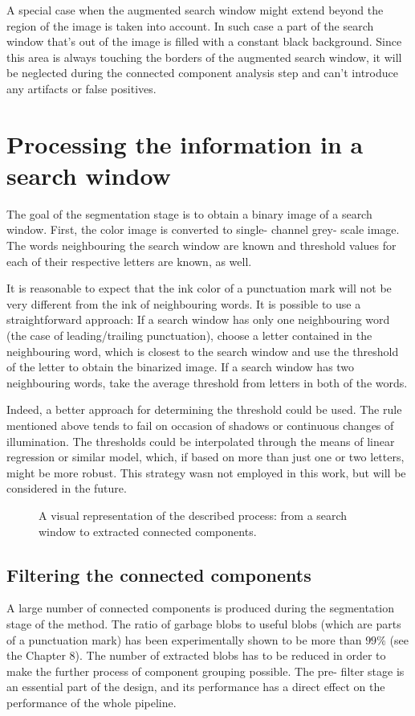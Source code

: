 \documentclass[12pt,a4paper]{report}
\begin{document}
A special case when the augmented search window might extend beyond the region of the image is taken into account. In such case a part of the search window that's out of the image is filled with a constant black background. Since this area is always touching the borders of the augmented search window, it will be neglected during the connected component analysis step and can't introduce any artifacts or false positives.

\section{Processing the information in a search window}
The goal of the segmentation stage is to obtain a binary image of a search window. First, the color image is converted to single- channel grey- scale image. The words neighbouring the search window are known and threshold values for each of their respective letters are known, as well.

It is reasonable to expect that the ink color of a punctuation mark will not be very different from the ink of neighbouring words. It is possible to use a straightforward approach: If a search window has only one neighbouring word (the case of leading/trailing punctuation), choose a letter contained in the neighbouring word, which is closest to the search window and use the threshold of the letter to obtain the binarized image. If a search window has two neighbouring words, take the average threshold from letters in both of the words.

Indeed, a better approach for determining the threshold could be used. The rule mentioned above tends to fail on occasion of shadows or continuous changes of illumination. The thresholds could be interpolated through the means of linear regression or similar model, which, if based on more than just one or two letters, might be more robust. This strategy wasn not employed in this work, but will be considered in the future.

\begin{figure}[htbp]
    \centering
    \caption{A visual representation of the described process: from a search window to extracted connected components.}
    \label{fig:segmentation-process}
\end{figure}

\subsection{Filtering the connected components}
A large number of connected components is produced during the segmentation stage of the method. The ratio of garbage blobs to useful blobs (which are parts of a punctuation mark) has been experimentally shown to be more than $99\%$ (see the Chapter 8). The number of extracted blobs has to be reduced in order to make the further process of component grouping possible. The pre- filter stage is an essential part of the design, and its performance has a direct effect on the performance of the whole pipeline.
\end{document}
